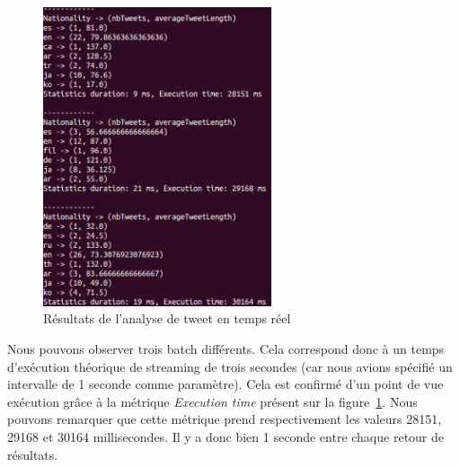     \begin{figure}
      \centering
      \includegraphics[width=0.6\textwidth]{images/stat_results.png}
      \caption{Résultats de l'analyse de tweet en temps réel}
      \label{fig:resultats_stat_tweet}
    \end{figure}

    Nous pouvons observer trois batch différents. Cela correspond donc à un temps d'exécution théorique de streaming de trois secondes (car nous avions spécifié un intervalle de 1 seconde comme paramètre). Cela est confirmé d'un point de vue exécution grâce à la métrique \emph{Execution time} présent sur la figure~\ref{fig:resultats_stat_tweet}. Nous pouvons remarquer que cette métrique prend respectivement les valeurs 28151, 29168 et 30164 millisecondes. Il y a donc bien 1 seconde entre chaque retour de résultats. \\

